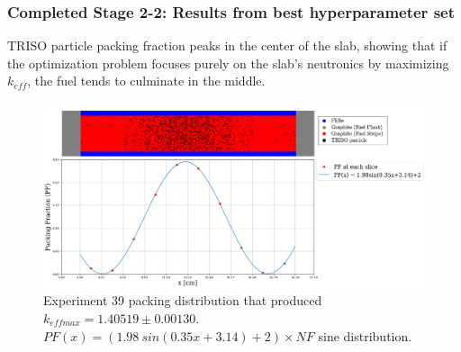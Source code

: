 \begin{frame}
    \frametitle{Completed Stage 2-2: Results from best hyperparameter set}
    TRISO particle packing fraction peaks in the center 
    of the slab, showing that if the optimization problem focuses purely on the 
    slab's neutronics by maximizing $k_{eff}$, the fuel tends to culminate in the 
    middle. 

    \begin{figure}[]
        \centering
        \includegraphics[width=0.8\linewidth]{../docs/figures/triso_distribution_sine_39.png} 
        \caption{Experiment 39 packing distribution that produced 
        $k_{eff max} = 1.40519 \pm 0.00130$. 
        $PF(x) = (1.98\ sin(0.35x+3.14)+2)  \times NF$ sine distribution. }
        \label{fig:triso_distribution_sine_39}
    \end{figure}
\end{frame}